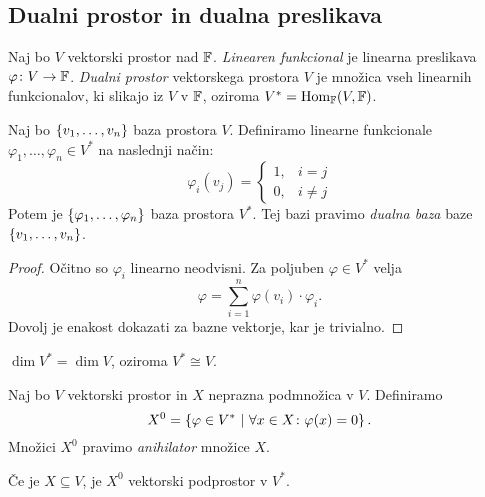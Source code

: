 \documentclass[12pt, a4paper]{article}
\begin{document}
\newpage

\subsection{Dualni prostor in dualna preslikava}

\begin{okvir}
\begin{definicija}
Naj bo $V$ vektorski prostor nad $\mathbb{F}$. \emph{Linearen funkcional} je linearna preslikava $\varphi\colon V\to\mathbb{F}$. \emph{Dualni prostor} vektorskega prostora $V$ je množica vseh linearnih funkcionalov, ki slikajo iz $V$ v $\mathbb{F}$, oziroma $V^*=\operatorname{Hom}_{\mathbb{F}}(V,\mathbb{F})$.
\end{definicija}
\end{okvir}

\begin{izrek}
Naj bo $\left\{v_1,\dots,v_n\right\}$ baza prostora $V$. Definiramo linearne funkcionale $\varphi_1,\dots,\varphi_n\in V^*$ na naslednji način:
\[
\varphi_i(v_j)=
\begin{cases}
1, &i=j
\\
0, &i\ne j
\end{cases}
\]
Potem je $\left\{\varphi_1,\dots,\varphi_n\right\}$ baza prostora $V^*$. Tej bazi pravimo \emph{dualna baza} baze $\left\{v_1,\dots,v_n\right\}$.
\end{izrek}

\begin{proof}
Očitno so $\varphi_i$ linearno neodvisni. Za poljuben $\varphi\in V^*$ velja
\[
\varphi=\sum_{i=1}^n \varphi(v_i)\cdot\varphi_i.
\]
Dovolj je enakost dokazati za bazne vektorje, kar je trivialno.
\end{proof}

\begin{posledica}
$\dim V^*=\dim V$, oziroma $V^*\cong V$.
\end{posledica}

\begin{definicija}
Naj bo $V$ vektorski prostor in $X$ neprazna podmnožica v $V$. Definiramo
\[
X^0=\left\{\varphi\in V^*~\middle\vert~\forall x\in X\colon\varphi(x)=0\right\}.
\]
Množici $X^0$ pravimo \emph{anihilator} množice $X$.
\end{definicija}

\begin{trditev}
Če je $X\subseteq V$, je $X^0$ vektorski podprostor v $V^*$.
\end{trditev}
\end{document}
